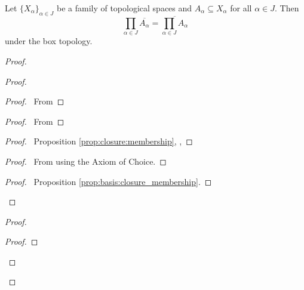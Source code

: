 \begin{prop}[AC]
  Let $\{ X_\alpha \}_{\alpha \in J}$ be a family of topological spaces and $A_\alpha \subseteq X_\alpha$ for all $\alpha \in J$. Then
  \[ \prod_{\alpha \in J} \overline{A_\alpha} = \overline{\prod_{\alpha \in J} A_\alpha} \]
  under the box topology.
\end{prop}

\begin{proof}
  \pf
  \begin{proof}
    \begin{proof}
      \pf\ From 
    \end{proof}
    \begin{proof}
      \pf\ From 
    \end{proof}
    \begin{proof}
      \pf\ Proposition \ref{prop:closure:membership}, , 
    \end{proof}
    \begin{proof}
      \pf\ From  using the Axiom of Choice.
    \end{proof}
    \qedstep
    \begin{proof}
      \pf\ Proposition \ref{prop:basis:closure_membership}.
    \end{proof}
  \end{proof}
  \begin{proof}
    \begin{proof}

\end{proof}
\end{proof}
\end{proof}
